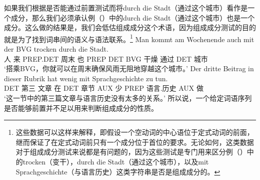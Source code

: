 如果我们根据是否能通过前置测试而将durch die Stadt（通过这个城市）看作是一个成分，那么我们必须承认例（）中的durch die Stadt（通过这个城市）也是一个成分。这么做的结果是，我们会低估组成成分这个术语，因为组成成分测试的目的就是为了找到词串间的语义与语法联系。\footnote{这些数据可以这样来解释，即假设一个空动词的中心语位于定式动词的前面，继而保证了在定式动词前只有一个成分位于首位的要求。\citep{Mueller2005d,MuellerGS}无论如何，这类数据对于组成成分测试来说都是有问题的，因为这些测试是专门用来区分例（）中的trocken（变干），durch die Stadt（通过这个城市），以及mit Sprachgeschichte（与语言历史）这类字符串是否是组成成分的。}
\eal
\ex 
\gll Man kommt am Wochenende auch mit der BVG trocken durch die Stadt.\\
     人 来 PREP.DET 周末 也 PREP DET BVG 干燥 通过 DET 城市\\
\glt `搭乘BVG，你就可以在周末确保风雨无阻地穿越这个城市。'
\ex 
\gll Der dritte Beitrag in dieser Rubrik hat wenig mit Sprachgeschichte zu tun.\\
     DET 第三  文章 在 DET 章节  AUX 少 PREP 语言.历史 AUX 做\\
\glt `这一节中的第三篇文章与语言历史没有太多的关系。'
\zl
所以说，一个给定词语序列是否能够前置并不足以用来判断组成成分的性质。

